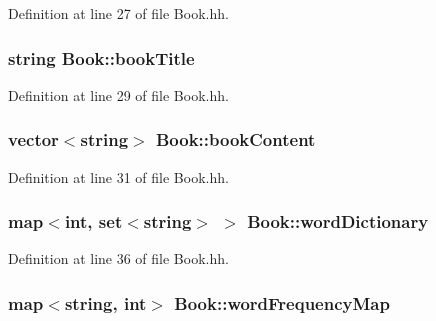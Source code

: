 Definition at line 27 of file Book.\+hh.

\hypertarget{class_book_a111d7b30bddd6166bd09764f050cfee3}{
\subsubsection[{book\+Title}]{\setlength{\rightskip}{0pt plus 5cm}string Book\+::book\+Title\hspace{0.3cm}{\ttfamily [private]}}}\label{class_book_a111d7b30bddd6166bd09764f050cfee3}


Definition at line 29 of file Book.\+hh.

\hypertarget{class_book_a62ca3f4431b699fa41384c8bab7ef4fa}{
\subsubsection[{book\+Content}]{\setlength{\rightskip}{0pt plus 5cm}vector$<$string$>$ Book\+::book\+Content\hspace{0.3cm}{\ttfamily [private]}}}\label{class_book_a62ca3f4431b699fa41384c8bab7ef4fa}


Definition at line 31 of file Book.\+hh.

\hypertarget{class_book_a3e21a804bd433b6c1b05790856ec973f}{
\subsubsection[{word\+Dictionary}]{\setlength{\rightskip}{0pt plus 5cm}map$<$int, set$<$string$>$ $>$ Book\+::word\+Dictionary\hspace{0.3cm}{\ttfamily [private]}}}\label{class_book_a3e21a804bd433b6c1b05790856ec973f}


Definition at line 36 of file Book.\+hh.

\hypertarget{class_book_a18b73c8d2b492cad5b7b0c187b08dfc0}{
\subsubsection[{word\+Frequency\+Map}]{\setlength{\rightskip}{0pt plus 5cm}map$<$string, int$>$ Book\+::word\+Frequency\+Map\hspace{0.3cm}{\ttfamily [private]}}}\label{class_book_a18b73c8d2b492cad5b7b0c187b08dfc0}


